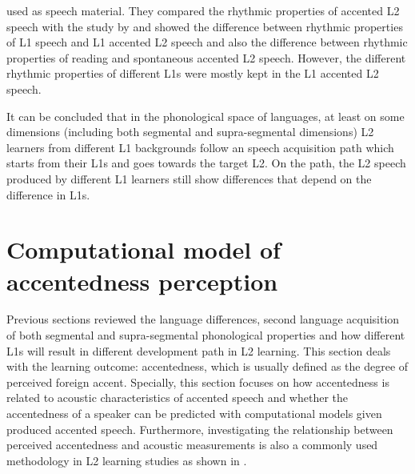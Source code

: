 used as speech material. They compared the rhythmic properties of accented L2 speech with the study by \cite{ramus1999correlates} and showed the difference between rhythmic properties of L1 speech and L1 accented L2 speech and also the difference between rhythmic properties of reading and spontaneous accented L2 speech. However, the different rhythmic properties of different L1s were mostly kept in the L1 accented L2 speech.

It can be concluded that in the phonological space of languages, at least on some dimensions (including both segmental and supra-segmental dimensions) L2 learners from different L1 backgrounds follow an speech acquisition path which starts from their L1s and goes towards the target L2. On the path, the L2 speech produced by different L1 learners still show differences that depend on the difference in L1s.

\section{Computational model of accentedness perception}
\label{sec:com_model}

Previous sections reviewed the language differences, second language acquisition of both segmental and supra-segmental phonological properties and how different L1s will result in different development path in L2 learning. This section deals with the learning outcome: accentedness, which is usually defined as the degree of perceived foreign accent. Specially, this section focuses on how accentedness is related to acoustic characteristics of accented speech and whether the accentedness of a speaker can be predicted with computational models given produced accented speech. Furthermore, investigating the relationship between perceived accentedness and acoustic measurements is also a commonly used methodology in L2 learning studies as shown in \citep{ordin2015acquisition,saito2016second}.

